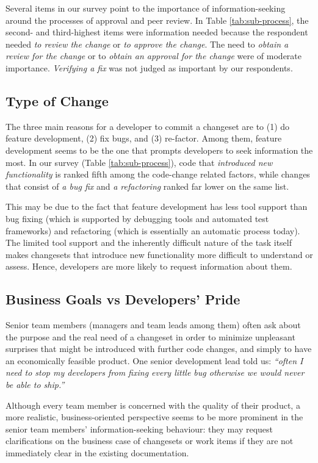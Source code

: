 Several items in our survey point to the importance of information-seeking around the processes of approval and peer review. In Table \ref{tab:sub-process}, the second- and third-highest items were information needed because the respondent needed \emph{to review the change} or \emph{to approve the change}. The need to  \emph{obtain a review for the change} or to \emph{obtain an approval for the change} were of moderate importance. \emph{Verifying a fix} was not judged as important by our respondents.

\subsection{Type of Change}
The three main reasons for a developer to commit a changeset are to (1) do feature development, (2) fix bugs, and (3) re-factor. Among them, feature development seems to be the one that prompts developers to seek information the most.
In our survey (Table \ref{tab:sub-process}), code that \emph{introduced new functionality} is ranked fifth among the code-change related factors, while changes that consist of \emph{a bug fix} and \emph{a refactoring} ranked far lower on the same list.

This may be due to the fact that feature development has less tool support than bug fixing (which is supported by debugging tools and automated test frameworks) and refactoring (which is essentially an automatic process today). The limited tool support and the inherently difficult nature of the task itself makes changesets that introduce new functionality more difficult to understand or assess. Hence, developers are more likely to request information about them.


\subsection{Business Goals vs Developers' Pride}
Senior team members (managers and team leads among them) often ask about the purpose and the real need of a changeset in order to minimize unpleasant surprises that might be introduced with further code changes, and simply to have an economically feasible product. One senior development lead told us: \emph{``often I need to stop my developers from fixing every little bug otherwise we would never be able to ship.''}

Although every team member is concerned with the quality of their product, a more realistic, business-oriented perspective seems to be more prominent in the senior team members' information-seeking behaviour: they may request clarifications on the business case of changesets or work items if they are not immediately clear in the existing documentation.


